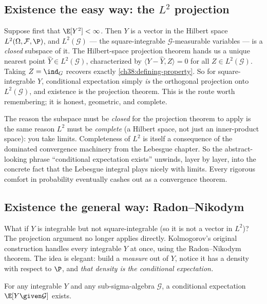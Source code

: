 \subsection{Existence the easy way: the \texorpdfstring{$L^2$}{L2} projection}
\label{ch38:existence-l2}

Suppose first that $\E[Y^2] < \infty$. Then $Y$ is a vector in the Hilbert space $L^2(\Omega,
\mathcal{F}, \P)$, and $L^2(\mathcal{G})$ --- the square-integrable $\mathcal{G}$-measurable
variables --- is a \emph{closed} subspace of it. The Hilbert-space projection theorem hands us a
unique nearest point $\hat Y \in L^2(\mathcal{G})$, characterized by $\langle Y - \hat Y, Z\rangle =
0$ for all $Z \in L^2(\mathcal{G})$. Taking $Z = \ind_G$ recovers exactly
\eqref{ch38:defining-property}. So for square-integrable $Y$, conditional expectation simply
\emph{is} the orthogonal projection onto $L^2(\mathcal{G})$, and existence is the projection theorem.
This is the route worth remembering; it is honest, geometric, and complete.

\begin{happeningbox}
The reason the subspace must be \emph{closed} for the projection theorem to apply is the same reason
$L^2$ must be \emph{complete} (a Hilbert space, not just an inner-product space): you take limits.
Completeness of $L^2$ is itself a consequence of the dominated convergence machinery from the Lebesgue
chapter. So the abstract-looking phrase ``conditional expectation exists'' unwinds, layer by layer,
into the concrete fact that the Lebesgue integral plays nicely with limits. Every rigorous comfort in
probability eventually cashes out as a convergence theorem.
\end{happeningbox}

\subsection{Existence the general way: Radon--Nikodym}
\label{ch38:existence-rn}

What if $Y$ is integrable but not square-integrable (so it is not a vector in $L^2$)? The projection
argument no longer applies directly. Kolmogorov's original construction handles every integrable $Y$
at once, using the Radon--Nikodym theorem. The idea is elegant: build a \emph{measure} out of $Y$,
notice it has a density with respect to $\P$, and \emph{that density is the conditional expectation.}

\begin{theorem}
\label{ch38:thm-existence}
For any integrable $Y$ and any sub-sigma-algebra $\mathcal{G}$, a conditional expectation
$\E[Y\given\mathcal{G}]$ exists.
\end{theorem}

